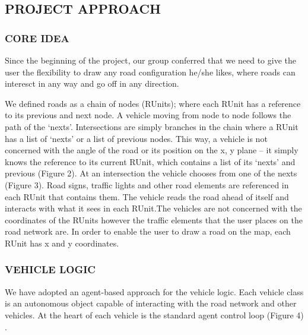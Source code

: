 \documentclass[11pt,a4paper]{article}
\begin{document}
 \subsection{PROJECT APPROACH}	
  \subsubsection{CORE IDEA}
  	Since the beginning of the project, our group conferred that we
  	need to give the user the flexibility to draw any road
  	configuration he/she likes, where roads can interesct in any way
  	and go off in any direction. 
	
  	\setlength{\parindent}{0cm}
  	We defined roads as a chain of nodes (RUnits); where each RUnit has
  	a reference to its previous and next node. A vehicle moving from
  	node to node follows the path of the ‘nexts'. Intersections are simply branches in the chain where a RUnit has a
  	list of ‘nexts’ or a list of previous nodes. This way, a vehicle is
  	not concerned with the angle of the road or its position on the x,
  	y plane – it simply knows the reference to its current RUnit, which
  	contains a list of its ‘nexts’ and previous (Figure 2). At an
  	intersection the vehicle chooses from one of the nexts (Figure 3).
  	Road signs, traffic lights and other road elements are referenced
  	in each RUnit that contains them. The vehicle reads the road ahead
  	of itself and interacts with what it sees in each RUnit.The vehicles are not concerned with the coordinates of the RUnits
	however the traffic elements that the user places on the road
	network are. In order to enable the user to draw a road on the map,
	each RUnit has x and y coordinates.
  	
  		\begin{figure}[!h]
           \begin{floatrow}
           \end{floatrow}
        \end{figure}
          	 
    \setlength{\parindent}{0cm}\bigskip
	 
	
	\subsubsection{VEHICLE LOGIC}
  	We have adopted an agent-based approach for the vehicle logic. Each
  	vehicle class is an autonomous object capable of interacting with
  	the road network and other vehicles. At the heart of each vehicle
  	is the standard agent control loop (Figure 4) \cite{agentControl}.
	
\end{document}
